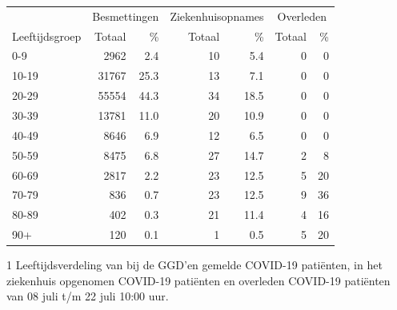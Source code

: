 \documentclass[
  english,
  man,floatsintext]{apa6}
\begin{document}
\begin{table}
\centering\begingroup\fontsize{11}{13}\selectfont

\begin{threeparttable}
\begin{tabular}{lrrrrrr}
\toprule
\multicolumn{1}{c}{ } & \multicolumn{2}{c}{Besmettingen} & \multicolumn{2}{c}{Ziekenhuisopnames} & \multicolumn{2}{c}{Overleden} \\
\cmidrule(l{3pt}r{3pt}){2-3} \cmidrule(l{3pt}r{3pt}){4-5} \cmidrule(l{3pt}r{3pt}){6-7}
Leeftijdsgroep & Totaal & \% & Totaal & \% & Totaal & \%\\
\midrule
0-9 & 2962 & 2.4 & 10 & 5.4 & 0 & 0\\
10-19 & 31767 & 25.3 & 13 & 7.1 & 0 & 0\\
20-29 & 55554 & 44.3 & 34 & 18.5 & 0 & 0\\
30-39 & 13781 & 11.0 & 20 & 10.9 & 0 & 0\\
40-49 & 8646 & 6.9 & 12 & 6.5 & 0 & 0\\
50-59 & 8475 & 6.8 & 27 & 14.7 & 2 & 8\\
60-69 & 2817 & 2.2 & 23 & 12.5 & 5 & 20\\
70-79 & 836 & 0.7 & 23 & 12.5 & 9 & 36\\
80-89 & 402 & 0.3 & 21 & 11.4 & 4 & 16\\
90+ & 120 & 0.1 & 1 & 0.5 & 5 & 20\\
\bottomrule
\end{tabular}
\begin{tablenotes}
\item[1] Leeftijdsverdeling van bij de GGD’en gemelde COVID-19 patiënten, in het ziekenhuis opgenomen COVID-19 patiënten en overleden COVID-19 patiënten van 08 juli t/m 22 juli 10:00 uur.
\end{tablenotes}
\end{threeparttable}
\endgroup{}
\end{table}

\newpage
\end{document}
